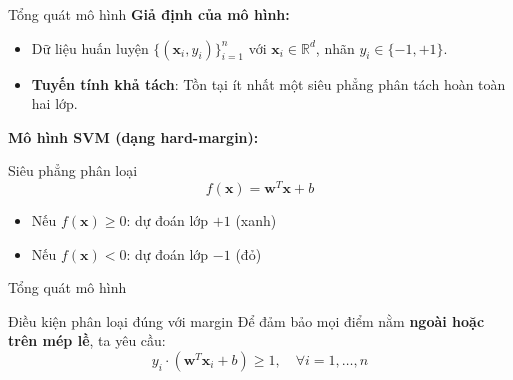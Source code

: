 \begin{frame}{Tổng quát mô hình}
  \textbf{Giả định của mô hình:}
  \begin{itemize}
    \item Dữ liệu huấn luyện $\{(\bm{x}_i, y_i)\}_{i=1}^n$ với $\bm{x}_i \in \mathbb{R}^d$, nhãn $y_i \in \{-1, +1\}$.
    \item \textbf{Tuyến tính khả tách}: Tồn tại ít nhất một siêu phẳng phân tách hoàn toàn hai lớp.
  \end{itemize}

  \vspace{0.3cm}
  \textbf{Mô hình SVM (dạng hard-margin):}
  \begin{block}{Siêu phẳng phân loại}
    \[
    f(\bm{x}) = \bm{w}^T \bm{x} + b
    \]
    \begin{itemize}
      \item Nếu $f(\bm{x}) \ge 0$: dự đoán lớp $+1$ (xanh)
      \item Nếu $f(\bm{x}) < 0$: dự đoán lớp $-1$ (đỏ)
    \end{itemize}
  \end{block}
\end{frame}

\begin{frame}{Tổng quát mô hình}
  \begin{alertblock}{Điều kiện phân loại đúng với margin}
    Để đảm bảo mọi điểm nằm \textbf{ngoài hoặc trên mép lề}, ta yêu cầu:
    \[
    y_i \cdot (\bm{w}^T \bm{x}_i + b) \geq 1, \quad \forall i = 1,\dots,n
    \]
  \end{alertblock}
\end{frame}


